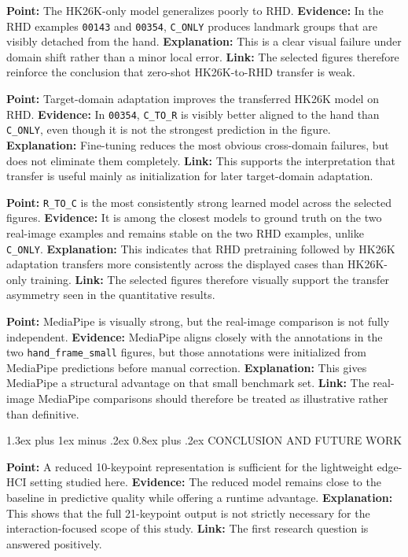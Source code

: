\documentclass[10pt,letterpaper]{article}
\makeatletter
\renewcommand\section{\@startsection{section}{1}{\z@}%
  {1.3ex plus 1ex minus .2ex}%
  {0.8ex plus .2ex}%
  {\centering\normalfont\small\scshape}}
\makeatother
\begin{document}
\medskip
\noindent\textbf{Point:} The HK26K-only model generalizes poorly to RHD.  
\textbf{Evidence:} In the RHD examples \texttt{00143} and \texttt{00354}, \texttt{C\_ONLY} produces landmark groups that are visibly detached from the hand.  
\textbf{Explanation:} This is a clear visual failure under domain shift rather than a minor local error.  
\textbf{Link:} The selected figures therefore reinforce the conclusion that zero-shot HK26K-to-RHD transfer is weak.

\medskip
\noindent\textbf{Point:} Target-domain adaptation improves the transferred HK26K model on RHD.  
\textbf{Evidence:} In \texttt{00354}, \texttt{C\_TO\_R} is visibly better aligned to the hand than \texttt{C\_ONLY}, even though it is not the strongest prediction in the figure.  
\textbf{Explanation:} Fine-tuning reduces the most obvious cross-domain failures, but does not eliminate them completely.  
\textbf{Link:} This supports the interpretation that transfer is useful mainly as initialization for later target-domain adaptation.

\medskip
\noindent\textbf{Point:} \texttt{R\_TO\_C} is the most consistently strong learned model across the selected figures.  
\textbf{Evidence:} It is among the closest models to ground truth on the two real-image examples and remains stable on the two RHD examples, unlike \texttt{C\_ONLY}.  
\textbf{Explanation:} This indicates that RHD pretraining followed by HK26K adaptation transfers more consistently across the displayed cases than HK26K-only training.  
\textbf{Link:} The selected figures therefore visually support the transfer asymmetry seen in the quantitative results.

\medskip
\noindent\textbf{Point:} MediaPipe is visually strong, but the real-image comparison is not fully independent.  
\textbf{Evidence:} MediaPipe aligns closely with the annotations in the two \texttt{hand\_frame\_small} figures, but those annotations were initialized from MediaPipe predictions before manual correction.  
\textbf{Explanation:} This gives MediaPipe a structural advantage on that small benchmark set.  
\textbf{Link:} The real-image MediaPipe comparisons should therefore be treated as illustrative rather than definitive.

\section{CONCLUSION AND FUTURE WORK}

\noindent\textbf{Point:} A reduced 10-keypoint representation is sufficient for the lightweight edge-HCI setting studied here.
\textbf{Evidence:} The reduced model remains close to the baseline in predictive quality while offering a runtime advantage.
\textbf{Explanation:} This shows that the full 21-keypoint output is not strictly necessary for the interaction-focused scope of this study.
\textbf{Link:} The first research question is answered positively.
\end{document}
